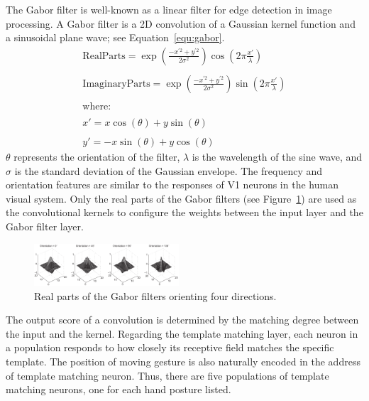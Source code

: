\documentclass[journal]{journal}
\begin{document}
The Gabor filter is well-known as a linear filter for edge detection in image processing. 
A Gabor filter is a 2D convolution of a Gaussian kernel function and a sinusoidal plane wave; see Equation~\ref{equ:gabor}. 
\begin{equation}
\begin{array}{l}
\mathrm{Real Parts} = \exp \left(\frac{-x^{'2}+y^{'2}}{2\sigma ^{2}}\right)\cos \left(2\pi\frac{{x}'}{\lambda }\right)
\\
\\
\mathrm{Imaginary Parts} = \exp \left(\frac{-x^{'2}+y^{'2}}{2\sigma ^{2}}\right)\sin \left(2\pi\frac{{x}'}{\lambda }\right)
\\
\\
\mathrm{where:}
\\
\\
{x}'=x\cos (\theta ) + y\sin (\theta)
\\
\\
{y}'=-x\sin (\theta ) + y\cos (\theta)
\end{array}
\label{equ:gabor}
\end{equation}
$\theta$ represents the orientation of the filter, $\lambda$ is the wavelength of the sine wave, and $\sigma$ is the standard deviation of the Gaussian envelope. 
The frequency and orientation features are similar to the responses of V1 neurons in the human visual system. 
Only the real parts of the Gabor filters (see Figure~\ref{fig:gabor}) are used as the convolutional kernels to configure the weights between the input layer and the Gabor filter layer.

\begin{figure}
\centering
	\includegraphics[width=0.48\textwidth]{pics/gabor.pdf}
	\caption{Real parts of the Gabor filters orienting four directions.}
	\label{fig:gabor}
\end{figure}

The output score of a convolution is determined by the matching degree between the input and the kernel.
Regarding the template matching layer, each neuron in a population responds to how closely its receptive field matches the specific template.
The position of moving gesture is also naturally encoded in the address of template matching neuron.
Thus, there are five populations of template matching neurons, one for each hand posture listed.
\end{document}
